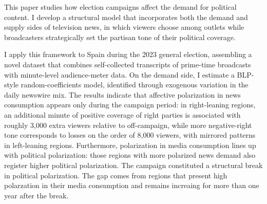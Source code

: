 \documentclass[12pt]{article}
\begin{document}

This paper studies how election campaigns affect the demand for political content. I develop a structural model that incorporates both the demand and supply sides of television news, in which viewers choose among outlets while broadcasters strategically set the partisan tone of their political coverage.
	
	
	
	
	I apply this framework to Spain during the 2023 general election, assembling a novel dataset that combines self-collected transcripts of prime-time broadcasts with minute-level audience-meter data. On the demand side, I estimate a BLP-style random-coefficients model, identified through exogenous variation in the daily newswire mix. The results indicate that affective polarization in news consumption appears only during the campaign period: in right-leaning regions, an additional minute of positive coverage of right parties is associated with roughly 3{,}000 extra viewers relative to off-campaign, while more negative-right tone corresponds to losses on the order of 8{,}000 viewers, with mirrored patterns in left-leaning regions. Furthermore, polarization in media consumption lines up with political polarization: those regions with more polarized news demand also register higher political polarization. The campaign constituted a structural break in political polarization. The gap comes from regions that present high polarzation in their media consumption and remains increaing for more than one year after the break. 
	
\end{document}
